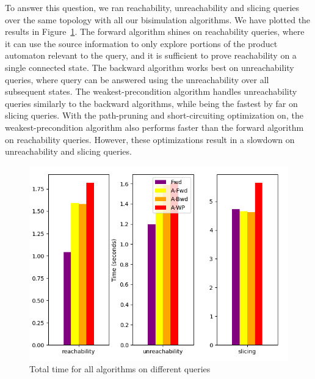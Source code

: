 To answer this question, we ran reachability, unreachability and
slicing queries over the same topology with all our bisimulation
algorithms.  We have plotted the results in
Figure~\ref{fig:graph-Q2}.  The forward algorithm shines on reachability
queries, where it can use the source information to only explore
portions of the product automaton relevant to the query, and it is
sufficient to prove reachability on a single connected state.  The
backward algorithm works best on unreachability queries, where query
can be answered using the unreachability over all subsequent states.
The weakest-precondition algorithm handles unreachability queries
similarly to the backward algorithms, while being the fastest by far
on slicing queries. With the path-pruning and short-circuiting
optimization on, the weakest-precondition algorithm also performs
faster than the forward algorithm on reachability queries. However,
these optimizations result in a slowdown on unreachability and slicing
queries.


\begin{figure}
\begin{center}
\includegraphics[scale=0.5]{figures/rq2.png}
\end{center}
\caption{Total time for all algorithms on different queries}
\label{fig:graph-Q2}
\end{figure}


